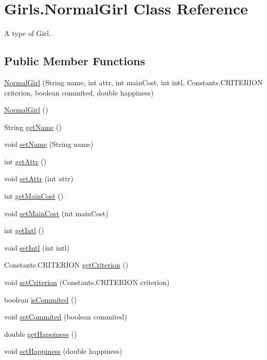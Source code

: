 \hypertarget{class_girls_1_1_normal_girl}{}\section{Girls.\+Normal\+Girl Class Reference}
\label{class_girls_1_1_normal_girl}


A type of Girl.  


\subsection*{Public Member Functions}
\begin{DoxyCompactItemize}
\item 
\hyperlink{class_girls_1_1_normal_girl_ad7e9902b8001319fa9e0cec02195dc91}{Normal\+Girl} (String name, int attr, int main\+Cost, int intl, Constants.\+C\+R\+I\+T\+E\+R\+I\+ON criterion, boolean commited, double happiness)
\item 
\hyperlink{class_girls_1_1_normal_girl_a4456c49bb42d059050b87df402be57e3}{Normal\+Girl} ()
\item 
String \hyperlink{class_girls_1_1_normal_girl_a56b9d41aa148e7b2fc0135af7570331b}{get\+Name} ()
\item 
void \hyperlink{class_girls_1_1_normal_girl_a50cbeff2c128b070e2b1ad8af1a27d9b}{set\+Name} (String name)
\item 
int \hyperlink{class_girls_1_1_normal_girl_a9b1a2f8b3c04e4222a02b749e2cd2195}{get\+Attr} ()
\item 
void \hyperlink{class_girls_1_1_normal_girl_afe65a87a2e18cdaa180deff6f271e6ed}{set\+Attr} (int attr)
\item 
int \hyperlink{class_girls_1_1_normal_girl_a10028058836f3acbeace8815082adba3}{get\+Main\+Cost} ()
\item 
void \hyperlink{class_girls_1_1_normal_girl_a3015f5c6eab63af2f56e2ee50175219e}{set\+Main\+Cost} (int main\+Cost)
\item 
int \hyperlink{class_girls_1_1_normal_girl_a688afa83c1c3963f458781e4d653439a}{get\+Intl} ()
\item 
void \hyperlink{class_girls_1_1_normal_girl_a37703e945d50081f3c4f17021185b523}{set\+Intl} (int intl)
\item 
Constants.\+C\+R\+I\+T\+E\+R\+I\+ON \hyperlink{class_girls_1_1_normal_girl_a760691e9f9d70d594e2051b380ac63cd}{get\+Criterion} ()
\item 
void \hyperlink{class_girls_1_1_normal_girl_ab0aa0a891ae73cce084ce0870db4fc62}{set\+Criterion} (Constants.\+C\+R\+I\+T\+E\+R\+I\+ON criterion)
\item 
boolean \hyperlink{class_girls_1_1_normal_girl_a97b95cb90e4763f1afe2bb7db93cd62f}{is\+Commited} ()
\item 
void \hyperlink{class_girls_1_1_normal_girl_ad1e4ed2af5f54cf23164f1bd72a058a6}{set\+Commited} (boolean commited)
\item 
double \hyperlink{class_girls_1_1_normal_girl_a091ae08a46b6452ae2f0081f8416d48b}{get\+Happiness} ()
\item 
void \hyperlink{class_girls_1_1_normal_girl_a48194fff57fe10b8dded3e6456241993}{set\+Happiness} (double happiness)
\end{DoxyCompactItemize}
